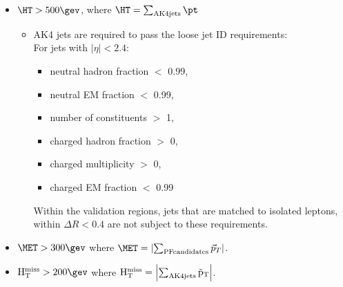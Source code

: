 \begin{itemize}

\item  $\HT > 500 \gev$, where $\HT = \sum_{\mathrm{AK4 jets}} \pt$ 
 \begin{itemize}
  \item AK4 jets are required to pass the loose jet ID requirements: \\
   For jets with $|\eta|<2.4$:
   \begin{itemize}
    \item neutral hadron fraction $<$ 0.99,
    \item neutral EM fraction $<$ 0.99,
    \item number of constituents $>$ 1,
    \item charged hadron fraction $>$ 0,
    \item charged multiplicity $>$ 0,
    \item charged EM fraction $<$ 0.99
   \end{itemize}
   Within the validation regions, jets that are matched to isolated leptons, within $\Delta R<0.4$ are not subject to these requirements.   
 \end{itemize}

\item $\MET>300 \gev$ where $\MET = \left|\sum_{\mathrm{PF candidates}} \vec{p}_{T}\right|$.

\item $\MHT>200 \gev$ where $\rm{H}_{\rm{T}}^{miss} = \left|\sum_{\mathrm{AK4 jets}} \vec{p}_{T}\right|$.


\end{itemize}
